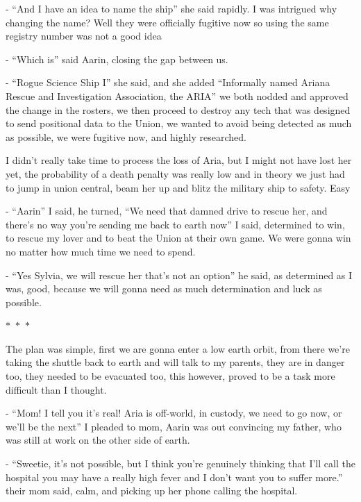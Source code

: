 \documentclass[colorlinks,12pt,a4paper]{book}
\newcommand\sep{\begin{center}
  \boldmath $\ast$~$\ast$~$\ast$
\end{center}}
\begin{document}
 - “And I have an idea to name the ship” she said rapidly. I was intrigued why changing the name? Well they were officially
  fugitive now so using the same registry number was not a good idea\par
  \bigskip
 
 - “Which is” said Aarin, closing the gap between us.\par
 \bigskip
 - “Rogue Science Ship I” she said, and she added “Informally named Ariana Rescue and Investigation Association, the ARIA” 
 we both nodded and approved the change in the rosters, we then proceed to destroy any tech that was designed to send 
 positional data to the Union, we wanted to avoid being detected as much as possible, we were fugitive now, and highly 
 researched.\par
 \bigskip
 
 I didn't really take time to process the loss of Aria, but I might not have lost her yet, the probability of a death penalty was 
 really low and in theory we just had to jump in union central, beam her up and blitz the military ship to safety. Easy\par
 \bigskip
 
 - “Aarin” I said, he turned, “We need that damned drive to rescue her, and there's no way you're sending me back to earth 
 now” I said, determined to win, to rescue my lover and to beat the Union at their own game. We were gonna win no matter 
 how much time we need to spend.\par
 \bigskip
 
 - “Yes Sylvia, we will rescue her that's not an option” he said, as determined as I was, good, because we will gonna need 
 as much determination and luck as possible.
 
 \sep
 
 The plan was simple, first we are gonna enter a low earth orbit, from there we're taking the shuttle back to earth and
  will talk to my parents, they are in danger too, they needed to be evacuated too, this however, proved to be a task 
  more difficult than I thought.\par
  \bigskip
 
 - “Mom! I tell you it's real! Aria is off-world, in custody, we need to go now, or we'll be the next” I pleaded to mom, 
 Aarin was out convincing my father, who was still at work on the other side of earth.\par
 \bigskip
 
 - “Sweetie, it's not possible, but I think you're genuinely thinking that I'll call the hospital you may have a really high 
 fever and I don't want you to suffer more.” their mom said, calm, and picking up her phone calling the hospital.\par
 \bigskip
 
\end{document}
